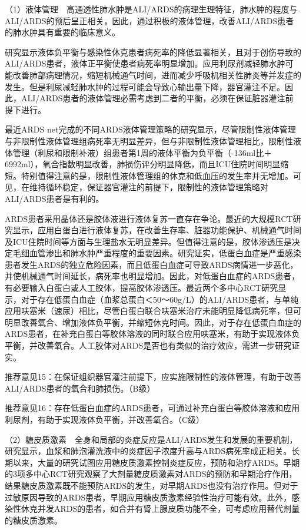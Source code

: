 （1）液体管理　高通透性肺水肿是ALI/ARDS的病理生理特征，肺水肿的程度与ALI/ARDS的预后呈正相关，因此，通过积极的液体管理，改善ALI/ARDS患者的肺水肿具有重要的临床意义。

研究显示液体负平衡与感染性休克患者病死率的降低显著相关，且对于创伤导致的ALI/ARDS患者，液体正平衡使患者病死率明显增加。应用利尿剂减轻肺水肿可能改善肺部病理情况，缩短机械通气时间，进而减少呼吸机相关性肺炎等并发症的发生。但是利尿减轻肺水肿的过程可能会导致心输出量下降，器官灌注不足。因此，ALI/ARDS患者的液体管理必需考虑到二者的平衡，必须在保证脏器灌注前提下进行。

最近ARDS
net完成的不同ARDS液体管理策略的研究显示，尽管限制性液体管理与非限制性液体管理组病死率无明显差异，但与非限制性液体管理相比，限制性液体管理（利尿和限制补液）组患者第1周的液体平衡为负平衡（-136ml比＋6992ml），氧合指数明显改善，肺损伤评分明显降低，而且ICU住院时间明显缩短。特别值得注意的是，限制性液体管理组的休克和低血压的发生率并无增加。可见，在维持循环稳定，保证器官灌注的前提下，限制性的液体管理策略对ALI/ARDS患者是有利的。

ARDS患者采用晶体还是胶体液进行液体复苏一直存在争论。最近的大规模RCT研究显示，应用白蛋白进行液体复苏，在改善生存率、脏器功能保护、机械通气时间及ICU住院时间等方面与生理盐水无明显差异。但值得注意的是，胶体渗透压是决定毛细血管渗出和肺水肿严重程度的重要因素。研究证实，低蛋白血症是严重感染患者发生ARDS的独立危险因素，而且低蛋白血症可导致ARDS病情进一步恶化，并使机械通气时间延长，病死率也明显增加。因此，对低蛋白血症的ARDS患者，有必要输入白蛋白或人工胶体，提高胶体渗透压。最近两个多中心RCT研究显示，对于存在低蛋白血症（血浆总蛋白＜50～60g/L）的ALI/ARDS患者，与单纯应用呋塞米（速尿）相比，尽管白蛋白联合呋塞米治疗未能明显降低病死率，但可明显改善氧合、增加液体负平衡，并缩短休克时间。因此，对于存在低蛋白血症的ARDS患者，在补充白蛋白等胶体溶液的同时联合应用呋塞米，有助于实现液体负平衡，并改善氧合。人工胶体对ARDS是否也有类似的治疗效应，需进一步研究证实。

推荐意见15：在保证组织器官灌注前提下，应实施限制性的液体管理，有助于改善ALI/ARDS患者的氧合和肺损伤。（B级）

推荐意见16：存在低蛋白血症的ARDS患者，可通过补充白蛋白等胶体溶液和应用利尿剂，有助于实现液体负平衡，并改善氧合。（C级）

（2）糖皮质激素　全身和局部的炎症反应是ALI/ARDS发生和发展的重要机制，研究显示，血浆和肺泡灌洗液中的炎症因子浓度升高与ARDS病死率成正相关。长期以来，大量的研究试图应用糖皮质激素控制炎症反应，预防和治疗ARDS。早期的3项多中心RCT研究观察了大剂量糖皮质激素对ARDS的预防和早期治疗作用，结果糖皮质激素既不能预防ARDS的发生，对早期ARDS也没有治疗作用。但对于过敏原因导致的ARDS患者，早期应用糖皮质激素经验性治疗可能有效。此外，感染性休克并发ARDS的患者，如合并有肾上腺皮质功能不全，可考虑应用替代剂量的糖皮质激素。

